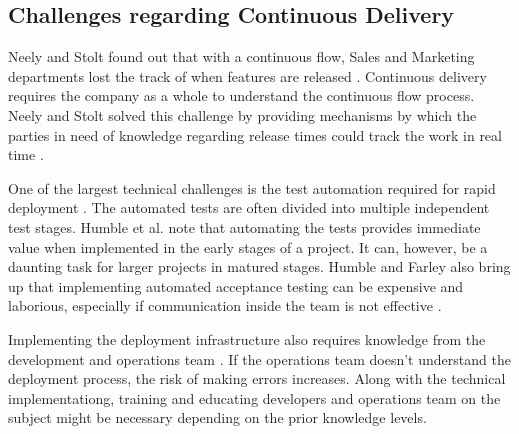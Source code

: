 \documentclass[english, grading]{tktltiki2}
\theoremstyle{definition}
\theoremstyle{remark}
\begin{document}

\subsection{Challenges regarding Continuous Delivery}
Neely and Stolt found out that with a continuous flow, Sales and Marketing departments lost the track of when features are released \cite{neely2013continuous}. Continuous delivery requires the company as a whole to understand the continuous flow process. Neely and Stolt solved this challenge by providing mechanisms by which the parties in need of knowledge regarding release times could track the work in real time \cite{neely2013continuous}. 

One of the largest technical challenges is the test automation required for rapid deployment \cite{humble2006deployment, cdbook}. The automated tests are often divided into multiple independent test stages. Humble et al. note that automating the tests provides immediate value when implemented in the early stages of a project. It can, however, be a daunting task for larger projects in matured stages. Humble and Farley also bring up that implementing automated acceptance testing can be expensive and laborious, especially if communication inside the team is not effective \cite{cdbook}. 

Implementing the deployment infrastructure also requires knowledge from the development and operations team \cite{cdbook}. If the operations team doesn't understand the deployment process, the risk of making errors increases. Along with the technical implementationg, training and educating developers and operations team on the subject might be necessary depending on the prior knowledge levels.
\end{document}
